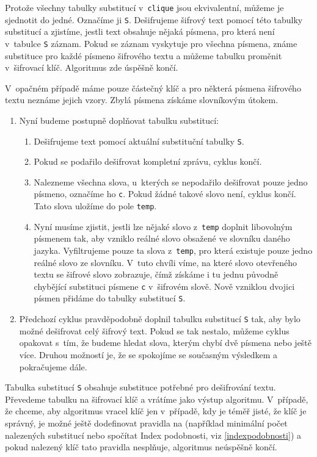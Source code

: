 \documentclass[12pt]{article}
\theoremstyle{definition}
\newcommand{\var}[1]{\texttt{#1}}
\begin{document}
Protože všechny tabulky substitucí v~\var{clique} jsou ekvivalentní, můžeme je sjednotit do jedné. Označíme ji \var{S}. Dešifrujeme šifrový text pomocí této tabulky substitucí a zjistíme, jestli text obsahuje nějaká písmena, pro která není v~tabulce \var{S} záznam. Pokud se záznam vyskytuje pro všechna písmena, známe substituce pro každé písmeno šifrového textu a můžeme tabulku proměnit v~šifrovací klíč. Algoritmus zde úspěšně končí. 

V~opačném případě máme pouze částečný klíč a pro některá písmena šifrového textu neznáme jejich vzory. Zbylá písmena získáme slovníkovým útokem. 

\begin{enumerate}
\item Nyní budeme postupně doplňovat tabulku substitucí:

\begin{enumerate}
\renewcommand{\labelenumii}{\arabic{enumi}. \arabic{enumii}.}
\item Dešifrujeme text pomocí aktuální substituční tabulky \var{S}.
\item Pokud se podařilo dešifrovat kompletní zprávu, cyklus končí.
\item Nalezneme všechna slova, u~kterých se nepodařilo dešifrovat pouze jedno písmeno, označíme ho \var{c}. Pokud žádné takové slovo není, cyklus končí. Tato slova uložíme do pole \var{temp}.
\item Nyní musíme zjistit, jestli lze nějaké slovo z~\var{temp} doplnit libovolným písmenem tak, aby vzniklo reálné slovo obsažené ve slovníku daného jazyka. Vyfiltrujeme pouze ta slova z~\var{temp}, pro která existuje pouze jedno reálné slovo ze slovníku. V~tuto chvíli víme, na které slovo otevřeného textu se šifrové slovo zobrazuje, čímž získáme i tu jednu původně chybějící substituci písmene \var{c} v~šifrovém slově. Nově vzniklou dvojici písmen přidáme do tabulky substitucí \var{S}. 
\end{enumerate}
\item Předchozí cyklus pravděpodobně doplnil tabulku substitucí \var{S} tak, aby bylo možné dešifrovat celý šifrový text. Pokud se tak nestalo, můžeme cyklus opakovat s~tím, že budeme hledat slova, kterým chybí dvě písmena nebo ještě více. Druhou možností je, že se spokojíme se současným výsledkem a pokračujeme dále. 
\end{enumerate}

Tabulka substitucí \var{S} obsahuje substituce potřebné pro dešifrování textu. Převedeme tabulku na šifrovací klíč a vrátíme jako výstup algoritmu. V~případě, že chceme, aby algoritmus vracel klíč jen v~případě, kdy je téměř jisté, že klíč je správný, je možné ještě dodefinovat pravidla na  (například minimální počet nalezených substitucí nebo spočítat Index podobnosti, viz \ref{indexpodobnosti}) a pokud nalezený klíč tato pravidla nesplňuje, algoritmus neúspěšně končí. 
\end{document}
